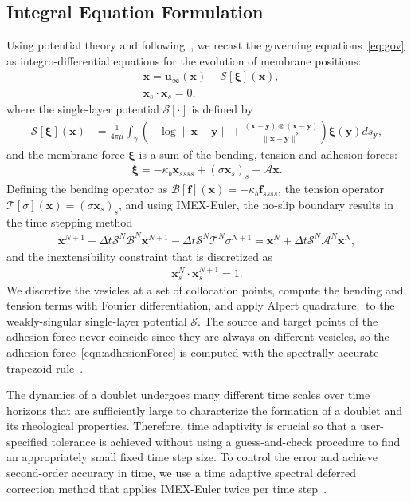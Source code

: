 \documentclass[prf,superscriptaddress,showkeys,longbibliography]{revtex4-1}
\renewcommand{\AA}{\mathcal{A}}
\newcommand{\BB}{\mathcal{B}}
\newcommand{\ff}{\mathbf{f}}
\renewcommand{\SS}{\mathcal{S}}
\newcommand{\TT}{\mathcal{T}}
\newcommand{\uu}{\mathbf{u}}
\newcommand{\xx}{\mathbf{x}}
\newcommand{\xxi}{\boldsymbol{\xi}}
\newcommand{\yy}{\mathbf{y}}
\begin{document}
\begin{appendices}
\section{Integral Equation Formulation}
\label{sec:AppendixB}
Using potential theory and following~\cite{Veerapaneni2009_JCP}, we recast the governing equations~\eqref{eq:gov} as integro-differential equations for the evolution of membrane positions: 
%
\begin{align*}
  &\dot{\xx} = \uu_{\infty}(\xx) + \SS[\xxi](\xx), \\
  &\xx_s \cdot \dot{\xx}_s = 0,
 \end{align*}
%
where the single-layer potential $\SS[\cdot]$ is defined by
\begin{align}
  \SS[\xxi](\xx) &= \frac{1}{4\pi\mu} \int_\gamma \left(
    -\log \|\xx - \yy\| + \frac{(\xx - \yy) \otimes (\xx - \yy)}{\|\xx - \yy\|^2} \right) 
    \xxi(\yy) ds_\yy, 
  \label{eqn:SLP}
\end{align}
%
and the membrane force $\xxi$ is a sum of the bending, tension and adhesion forces: 
\begin{align}
\xxi = -\kappa_b \xx_{ssss} + (\sigma \xx_s)_s + \AA\xx.
\label{eqn:traction}
\end{align}
Defining the bending operator as $\BB[\ff](\xx) = -\kappa_b \ff_{ssss}$,
the tension operator $\TT[\sigma](\xx) = (\sigma \xx_s)_s$, and using
IMEX-Euler, the no-slip boundary results in the time stepping method
\begin{align*}
  \xx^{N+1} - \Delta t \SS^N \BB^N \xx^{N+1} - 
    \Delta t \SS^N \TT^N \sigma^{N+1} = \xx^N + 
    \Delta t \SS^N \AA^N \xx^N,
\end{align*}
and the inextensibility constraint that is discretized as
\begin{align*}
  \xx_s^{N} \cdot \xx_{s}^{N+1} = 1.
\end{align*}
We discretize the vesicles at a set of collocation points, compute the
bending and tension terms with Fourier differentiation, and apply Alpert
quadrature~\cite{alp1999} to the weakly-singular single-layer potential
$\SS$.  The source and target points of the adhesion force never
coincide since they are always on different vesicles, so the adhesion
force~\eqref{eqn:adhesionForce} is computed with the spectrally accurate
trapezoid rule~\cite{tre-wei2014}.  

The dynamics of a doublet undergoes many different time scales over time
horizons that are sufficiently large to characterize the formation of a
doublet and its rheological properties.  Therefore, time adaptivity is
crucial so that a user-specified tolerance is achieved without using a
guess-and-check procedure to find an appropriately small fixed time step
size.  To control the error and achieve second-order accuracy in time,
we use a time adaptive spectral deferred correction method that
applies IMEX-Euler twice per time step~\cite{quaife2016adaptive}. 



\end{appendices}
\end{document}
